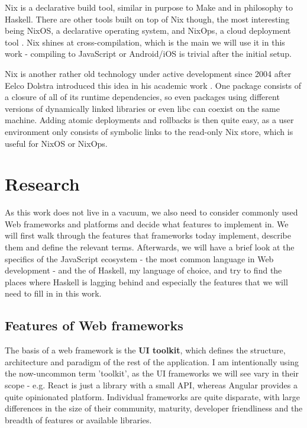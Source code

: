 \documentclass[english,odsaz]{fitthesis}
\begin{document}
Nix is a declarative build tool, similar in purpose to Make and in philosophy to
Haskell. There are other tools built on top of Nix though, the most interesting
being NixOS, a declarative operating system, and NixOps, a cloud deployment tool
\cite{dolstra2008nixos}. Nix shines at cross-compilation, which is the main we
will use it in this work - compiling to JavaScript or Android/iOS is trivial
after the initial setup.

Nix is another rather old technology under active development since 2004 after
Eelco Dolstra introduced this idea in his academic work
\cite{dolstra2006purely}. One package consists of a closure of all of its runtime
dependencies, so even packages using different versions of dynamically linked
libraries or even libc can coexist on the same machine. Adding atomic
deployments and rollbacks is then quite easy, as a user environment only
consists of symbolic links to the read-only Nix store, which is useful for NixOS
or NixOps.

\chapter{Research}
\label{sec:org71399d4}
As this work does not live in a vacuum, we also need to consider commonly used
Web frameworks and platforms and decide what features to implement in. We will
first walk through the features that frameworks today implement, describe them
and define the relevant terms. Afterwards, we will have a brief look at the
specifics of the JavaScript ecosystem - the most common language in Web
development - and the of Haskell, my language of choice, and try to find the
places where Haskell is lagging behind and especially the features that we will
need to fill in in this work.

\section{Features of Web frameworks}
\label{sec:org89fc9a8}
The basis of a web framework is the \textbf{UI toolkit}, which defines the structure,
architecture and paradigm of the rest of the application. I am intentionally
using the now-uncommon term 'toolkit', as the UI frameworks we will see vary in
their scope - e.g. React is just a library with a small API, whereas Angular
provides a quite opinionated platform. Individual frameworks are quite
disparate, with large differences in the size of their community, maturity,
developer friendliness and the breadth of features or available libraries.
\end{document}
